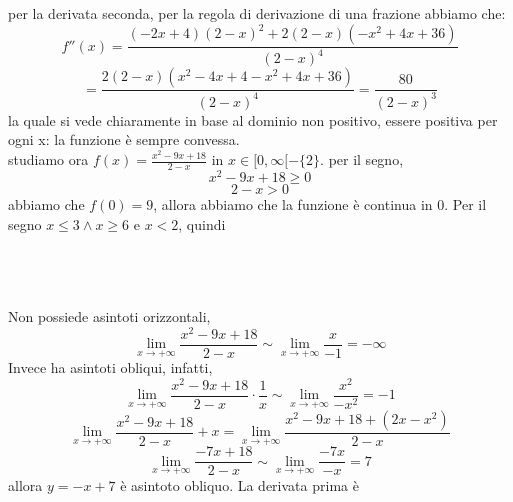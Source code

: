 \documentclass{article}
\begin{document}
per la derivata seconda, per la regola di derivazione di una frazione abbiamo che:
\[
f''(x) = \frac{(-2x+4)(2-x)^2+2(2-x)(-x^2+4x+36)}{(2-x)^4} 
\]
\[
= \frac{2(2-x)(x^2-4x+4-x^2+4x+36)}{(2-x)^4}
= \frac{80}{(2-x)^3}
\]
la quale si vede chiaramente in base al dominio non positivo, essere positiva per ogni x: la funzione è sempre convessa.\\
studiamo ora $f(x) = \frac{x^2 - 9x + 18}{2-x}$ in $x \in [0, \infty[ - \{2\}$.
per il segno,
\[
x^2-9x+18 \geq 0
\]
\[
2 - x> 0
\]
abbiamo che $f(0) = 9$, allora abbiamo che la funzione è continua in 0. Per il segno 
$x \leq 3 \land x \geq 6 $ e $x < 2$, quindi
\\\\
\\\\
Non possiede asintoti orizzontali,
\[
\lim_{x \to +\infty}\frac{x^2 - 9x + 18}{2-x} \sim \lim_{x \to +\infty}\frac{x}{-1} = -\infty 
\]
Invece ha asintoti obliqui, infatti,
\[
\lim_{x \to +\infty}\frac{x^2 - 9x + 18}{2-x} \cdot \frac{1}{x} \sim \lim_{x \to +\infty}\frac{x^2}{-x^2} = -1
\]
\[
\lim_{x \to +\infty}\frac{x^2 - 9x + 18}{2-x} + x =  \lim_{x \to +\infty}\frac{x^2 - 9x + 18 + (2x-x^2)}{2-x}
\]
\[
\lim_{x \to +\infty}\frac{-7x +18}{2-x} \sim \lim_{x \to +\infty}\frac{-7x}{-x} = 7
\]
allora $y = -x + 7$ è asintoto obliquo. La derivata prima è\\
\end{document}
